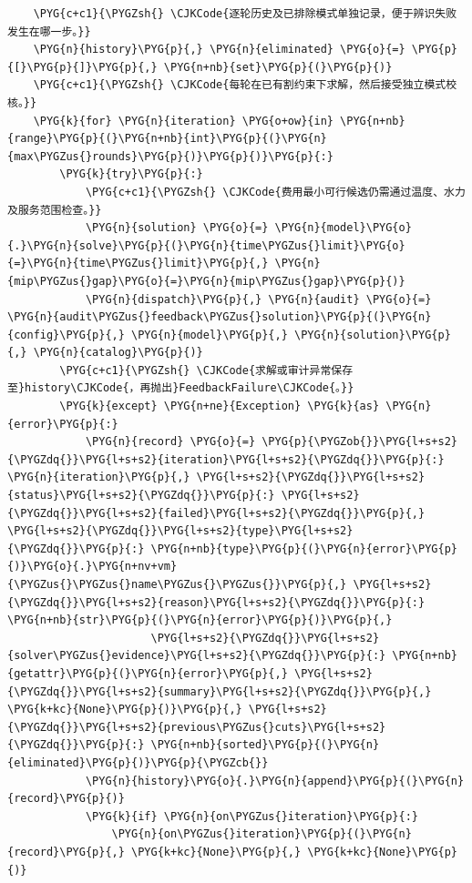 \begin{Verbatim}
    \PYG{c+c1}{\PYGZsh{} \CJKCode{逐轮历史及已排除模式单独记录，便于辨识失败发生在哪一步。}}
    \PYG{n}{history}\PYG{p}{,} \PYG{n}{eliminated} \PYG{o}{=} \PYG{p}{[}\PYG{p}{]}\PYG{p}{,} \PYG{n+nb}{set}\PYG{p}{(}\PYG{p}{)}
    \PYG{c+c1}{\PYGZsh{} \CJKCode{每轮在已有割约束下求解，然后接受独立模式校核。}}
    \PYG{k}{for} \PYG{n}{iteration} \PYG{o+ow}{in} \PYG{n+nb}{range}\PYG{p}{(}\PYG{n+nb}{int}\PYG{p}{(}\PYG{n}{max\PYGZus{}rounds}\PYG{p}{)}\PYG{p}{)}\PYG{p}{:}
        \PYG{k}{try}\PYG{p}{:}
            \PYG{c+c1}{\PYGZsh{} \CJKCode{费用最小可行候选仍需通过温度、水力及服务范围检查。}}
            \PYG{n}{solution} \PYG{o}{=} \PYG{n}{model}\PYG{o}{.}\PYG{n}{solve}\PYG{p}{(}\PYG{n}{time\PYGZus{}limit}\PYG{o}{=}\PYG{n}{time\PYGZus{}limit}\PYG{p}{,} \PYG{n}{mip\PYGZus{}gap}\PYG{o}{=}\PYG{n}{mip\PYGZus{}gap}\PYG{p}{)}
            \PYG{n}{dispatch}\PYG{p}{,} \PYG{n}{audit} \PYG{o}{=} \PYG{n}{audit\PYGZus{}feedback\PYGZus{}solution}\PYG{p}{(}\PYG{n}{config}\PYG{p}{,} \PYG{n}{model}\PYG{p}{,} \PYG{n}{solution}\PYG{p}{,} \PYG{n}{catalog}\PYG{p}{)}
        \PYG{c+c1}{\PYGZsh{} \CJKCode{求解或审计异常保存至}history\CJKCode{，再抛出}FeedbackFailure\CJKCode{。}}
        \PYG{k}{except} \PYG{n+ne}{Exception} \PYG{k}{as} \PYG{n}{error}\PYG{p}{:}
            \PYG{n}{record} \PYG{o}{=} \PYG{p}{\PYGZob{}}\PYG{l+s+s2}{\PYGZdq{}}\PYG{l+s+s2}{iteration}\PYG{l+s+s2}{\PYGZdq{}}\PYG{p}{:} \PYG{n}{iteration}\PYG{p}{,} \PYG{l+s+s2}{\PYGZdq{}}\PYG{l+s+s2}{status}\PYG{l+s+s2}{\PYGZdq{}}\PYG{p}{:} \PYG{l+s+s2}{\PYGZdq{}}\PYG{l+s+s2}{failed}\PYG{l+s+s2}{\PYGZdq{}}\PYG{p}{,} \PYG{l+s+s2}{\PYGZdq{}}\PYG{l+s+s2}{type}\PYG{l+s+s2}{\PYGZdq{}}\PYG{p}{:} \PYG{n+nb}{type}\PYG{p}{(}\PYG{n}{error}\PYG{p}{)}\PYG{o}{.}\PYG{n+nv+vm}{\PYGZus{}\PYGZus{}name\PYGZus{}\PYGZus{}}\PYG{p}{,} \PYG{l+s+s2}{\PYGZdq{}}\PYG{l+s+s2}{reason}\PYG{l+s+s2}{\PYGZdq{}}\PYG{p}{:} \PYG{n+nb}{str}\PYG{p}{(}\PYG{n}{error}\PYG{p}{)}\PYG{p}{,}
                      \PYG{l+s+s2}{\PYGZdq{}}\PYG{l+s+s2}{solver\PYGZus{}evidence}\PYG{l+s+s2}{\PYGZdq{}}\PYG{p}{:} \PYG{n+nb}{getattr}\PYG{p}{(}\PYG{n}{error}\PYG{p}{,} \PYG{l+s+s2}{\PYGZdq{}}\PYG{l+s+s2}{summary}\PYG{l+s+s2}{\PYGZdq{}}\PYG{p}{,} \PYG{k+kc}{None}\PYG{p}{)}\PYG{p}{,} \PYG{l+s+s2}{\PYGZdq{}}\PYG{l+s+s2}{previous\PYGZus{}cuts}\PYG{l+s+s2}{\PYGZdq{}}\PYG{p}{:} \PYG{n+nb}{sorted}\PYG{p}{(}\PYG{n}{eliminated}\PYG{p}{)}\PYG{p}{\PYGZcb{}}
            \PYG{n}{history}\PYG{o}{.}\PYG{n}{append}\PYG{p}{(}\PYG{n}{record}\PYG{p}{)}
            \PYG{k}{if} \PYG{n}{on\PYGZus{}iteration}\PYG{p}{:}
                \PYG{n}{on\PYGZus{}iteration}\PYG{p}{(}\PYG{n}{record}\PYG{p}{,} \PYG{k+kc}{None}\PYG{p}{,} \PYG{k+kc}{None}\PYG{p}{)}

\end{Verbatim}
